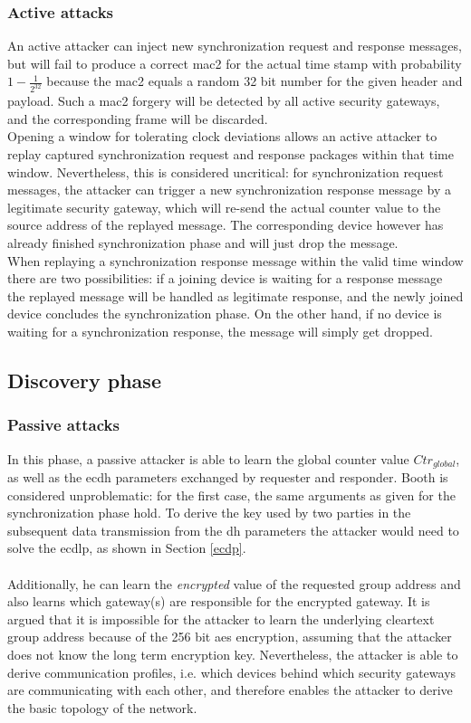 \subsubsection{Active attacks}
An active attacker can inject new synchronization request and response messages, but will fail to produce a correct \gls{mac2} for the actual time stamp with probability
$1-\frac{1}{2^{32}}$ because
the \gls{mac2} equals a random 32 bit number for the given header and payload. Such a \gls{mac2} forgery will be detected by all active security gateways,
and the corresponding frame will be discarded. 
\\
Opening a window for tolerating clock deviations allows an active attacker to replay captured synchronization request and response packages within that time window.
Nevertheless, this is considered uncritical: for synchronization request messages, the attacker can trigger a new synchronization response message by a legitimate security gateway, which
will re-send the actual counter value to the source address of the replayed message. The corresponding device however has already finished synchronization phase and will just drop
the message.
\\
When replaying a synchronization response message within the valid time window there are two possibilities: if a joining device is waiting for a response message the replayed message
will be handled as legitimate response, and the newly joined device concludes the synchronization phase. On the other hand, if no device is waiting for a synchronization response,
the message will simply get dropped.

\subsection{Discovery phase}
\subsubsection{Passive attacks}
In this phase, a passive attacker is able to learn the global counter value $Ctr_{global}$, as well as the \gls{ecdh} parameters exchanged by requester and responder.
Booth is considered unproblematic: for the first case, the same arguments as given for the synchronization phase hold. To derive the key used by two parties in the subsequent
data transmission from the \gls{dh} parameters the attacker would need to solve the \gls{ecdlp}, as shown in Section \ref{ecdp}.
\\
\\
Additionally, he can learn 
the \textit{encrypted} value of the requested group address and also learns which gateway(s) are responsible for the encrypted gateway. It is argued that it is impossible for the
attacker to learn the underlying cleartext group address because of the 256 bit \gls{aes} encryption, assuming that the attacker does not know the long term encryption key.
Nevertheless, the attacker is able to derive communication profiles, i.e.
which devices behind which security gateways are communicating with each other, and therefore enables the attacker to derive the basic topology of the network.

